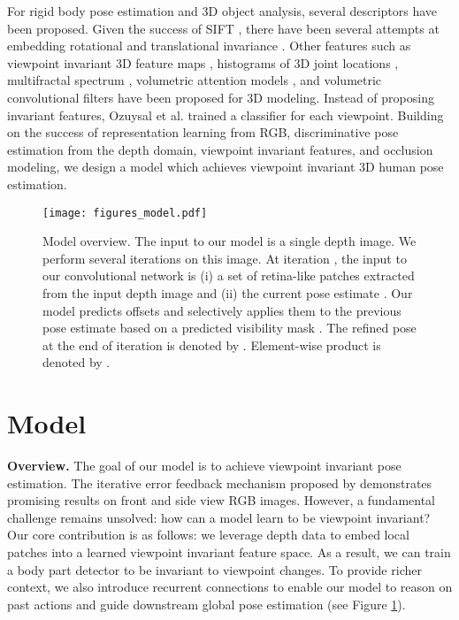 \documentclass[runningheads]{llncs}
\begin{document}
	For rigid body pose estimation and 3D object analysis, several descriptors have been proposed. Given the success of SIFT \cite{lowe1999object}, there have been several attempts at embedding rotational and translational invariance \cite{savarese20073d,wu20083d,alahi2008object}. Other features such as viewpoint invariant 3D feature maps \cite{liebelt2008viewpoint}, histograms of 3D joint locations \cite{xia2012view}, multifractal spectrum  \cite{xu2009viewpoint}, volumetric attention models \cite{haque2016recurrent}, and volumetric convolutional filters \cite{maturana20153d,maturana2015voxnet} have been proposed for 3D modeling. Instead of proposing invariant features, Ozuysal et al. \cite{ozuysal2009pose} trained a classifier for each viewpoint.
	Building on the success of representation learning from RGB, discriminative pose estimation from the depth domain, viewpoint invariant features, and occlusion modeling, we design a model which achieves viewpoint invariant 3D human pose estimation.

	\begin{figure}[t]
		\centering
		\texttt{[image: figures\_model.pdf]}
		\caption{Model overview. The input to our model is a single depth image. We perform several iterations on this image. At iteration , the input to our convolutional network is (i) a set of retina-like patches  extracted from the input depth image and (ii) the current pose estimate . Our model predicts offsets  and selectively applies them to the previous pose estimate based on a predicted visibility mask . The refined pose at the end of iteration  is denoted by . Element-wise product is denoted by .}
		\label{fig:model}
	\end{figure}

	\section{Model}\label{sec:model}
	\textbf{Overview.} The goal of our model is to achieve viewpoint invariant pose estimation.
	The iterative error feedback mechanism proposed by \cite{carreira2015human} demonstrates promising results on front and side view RGB images.
	However, a fundamental challenge remains unsolved: how can a model learn to be viewpoint invariant?
	Our core contribution is as follows: we leverage depth data to embed local patches into a learned viewpoint invariant feature space.
	As a result, we can train a body part detector to be invariant to viewpoint changes.
	To provide richer context, we also introduce recurrent connections to enable our model to reason on past actions and guide downstream global pose estimation (see Figure \ref{fig:model}).
\end{document}
